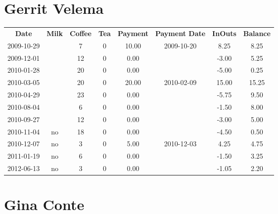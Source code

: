 \section{Gerrit Velema}

\begin{center}
\begin{tabular}{cccccccc}
\textbf{Date} & \textbf{Milk} & \textbf{Coffee} & \textbf{Tea} & \textbf{Payment} & \textbf{Payment Date} & \textbf{InOuts} & \textbf{Balance} \\
2009-10-29 &  &  7 & 0 & 10.00 & 2009-10-20 &  8.25 &  8.25\\ 
2009-12-01 &  & 12 & 0 &  0.00 &  & -3.00 &  5.25\\ 
2010-01-28 &  & 20 & 0 &  0.00 &  & -5.00 &  0.25\\ 
2010-03-05 &  & 20 & 0 & 20.00 & 2010-02-09 & 15.00 & 15.25\\ 
2010-04-29 &  & 23 & 0 &  0.00 &  & -5.75 &  9.50\\ 
2010-08-04 &  &  6 & 0 &  0.00 &  & -1.50 &  8.00\\ 
2010-09-27 &  & 12 & 0 &  0.00 &  & -3.00 &  5.00\\ 
2010-11-04 & no & 18 & 0 &  0.00 &  & -4.50 &  0.50\\ 
2010-12-07 & no &  3 & 0 &  5.00 & 2010-12-03 &  4.25 &  4.75\\ 
2011-01-19 & no &  6 & 0 &  0.00 &  & -1.50 &  3.25\\ 
2012-06-13 & no &  3 & 0 &  0.00 &  & -1.05 &  2.20
\end{tabular}
\end{center}

\section{Gina Conte}

